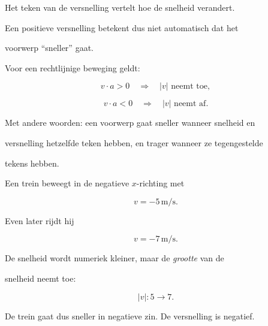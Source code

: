 \documentclass{ximera}
\begin{document}
Het teken van de versnelling vertelt hoe de snelheid verandert.

Een positieve versnelling betekent dus niet automatisch dat het

voorwerp ``sneller'' gaat.

\begin{eigenschap}

Voor een rechtlijnige beweging geldt:

\[v\cdot a>0 \quad\Rightarrow\quad |v|\text{ neemt toe},\]

\[v\cdot a<0 \quad\Rightarrow\quad |v|\text{ neemt af}.\]

Met andere woorden: een voorwerp gaat sneller wanneer snelheid en

versnelling hetzelfde teken hebben, en trager wanneer ze tegengestelde

tekens hebben.

\end{eigenschap}

\begin{voorbeeld}

Een trein beweegt in de negatieve $x$-richting met

\[v=-5\,\mathrm{m/s}.\]

Even later rijdt hij

\[v=-7\,\mathrm{m/s}.\]

De snelheid wordt numeriek kleiner, maar de \emph{grootte} van de

snelheid neemt toe:

\[|v|:5\longrightarrow7.\]

De trein gaat dus sneller in negatieve zin. De versnelling is negatief.

\end{voorbeeld}
\end{document}
